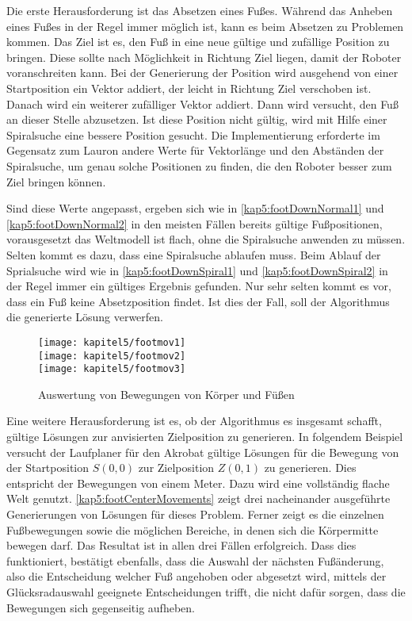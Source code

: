Die erste Herausforderung ist das Absetzen eines Fußes. Während das Anheben eines Fußes in der Regel immer möglich ist, kann es beim Absetzen zu Problemen kommen. Das Ziel ist es, den Fuß in eine neue gültige und zufällige Position zu bringen. Diese sollte nach Möglichkeit in Richtung Ziel liegen, damit der Roboter voranschreiten kann. Bei der Generierung der Position wird ausgehend von einer Startposition ein Vektor addiert, der leicht in Richtung Ziel verschoben ist. Danach wird ein weiterer zufälliger Vektor addiert. Dann wird versucht, den Fuß an dieser Stelle abzusetzen. Ist diese Position nicht gültig, wird mit Hilfe einer Spiralsuche eine bessere Position gesucht. Die Implementierung erforderte im Gegensatz zum Lauron andere Werte für Vektorlänge und den Abständen der Spiralsuche, um genau solche Positionen zu finden, die den Roboter besser zum Ziel bringen können.

Sind diese Werte angepasst, ergeben sich wie in \autoref{kap5:footDownNormal1} und \autoref{kap5:footDownNormal2} in den meisten Fällen bereits gültige Fußpositionen, vorausgesetzt das Weltmodell ist flach, ohne die Spiralsuche anwenden zu müssen. Selten kommt es dazu, dass eine Spiralsuche ablaufen muss. Beim Ablauf der Sprialsuche wird wie in \autoref{kap5:footDownSpiral1} und \autoref{kap5:footDownSpiral2} in der Regel immer ein gültiges Ergebnis gefunden. Nur sehr selten kommt es vor, dass ein Fuß keine Absetzposition findet. Ist dies der Fall, soll der Algorithmus die generierte Lösung verwerfen.

\begin{figure}[b!]
    \begin{center}
    \texttt{[image: kapitel5/footmov1]}\hfill
    \\[\smallskipamount]
    \texttt{[image: kapitel5/footmov2]}\hfill
    \\[\smallskipamount]
    \texttt{[image: kapitel5/footmov3]}\hfill
    \caption{Auswertung von Bewegungen von Körper und Füßen}\label{kap5:footCenterMovements}
    \end{center}
\end{figure}

Eine weitere Herausforderung ist es, ob der Algorithmus es insgesamt schafft, gültige Lösungen zur anvisierten Zielposition zu generieren. In folgendem Beispiel versucht der Laufplaner für den Akrobat gültige Lösungen für die Bewegung von der Startposition $S(0,0)$ zur Zielposition $Z(0,1)$ zu generieren. Dies entspricht der Bewegungen von einem Meter. Dazu wird eine vollständig flache Welt genutzt. \autoref{kap5:footCenterMovements} zeigt drei nacheinander ausgeführte Generierungen von Lösungen für dieses Problem. Ferner zeigt es die einzelnen Fußbewegungen sowie die möglichen Bereiche, in denen sich die Körpermitte bewegen darf. Das Resultat ist in allen drei Fällen erfolgreich. Dass dies funktioniert, bestätigt ebenfalls, dass die Auswahl der nächsten Fußänderung, also die Entscheidung welcher Fuß angehoben oder abgesetzt wird, mittels der Glücksradauswahl geeignete Entscheidungen trifft, die nicht dafür sorgen, dass die Bewegungen sich gegenseitig aufheben.